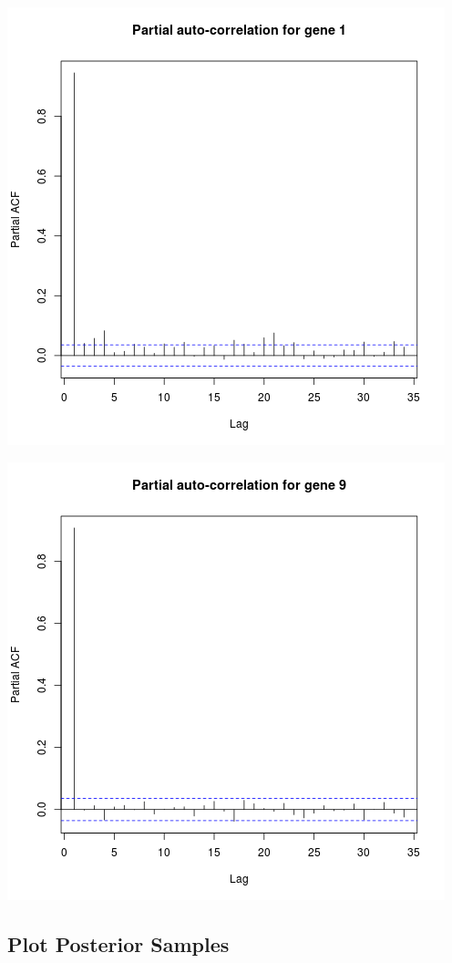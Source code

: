 \documentclass{article}
\begin{document}
	\includegraphics[scale=0.5]{../chosen_100/3000_steps/BIS10/pacf/1_pacf.png}
	
	\includegraphics[scale=0.5]{../chosen_100/3000_steps/BIS10/pacf/9_pacf.png}
 
 \subsection{Plot Posterior Samples}
 
\end{document}
